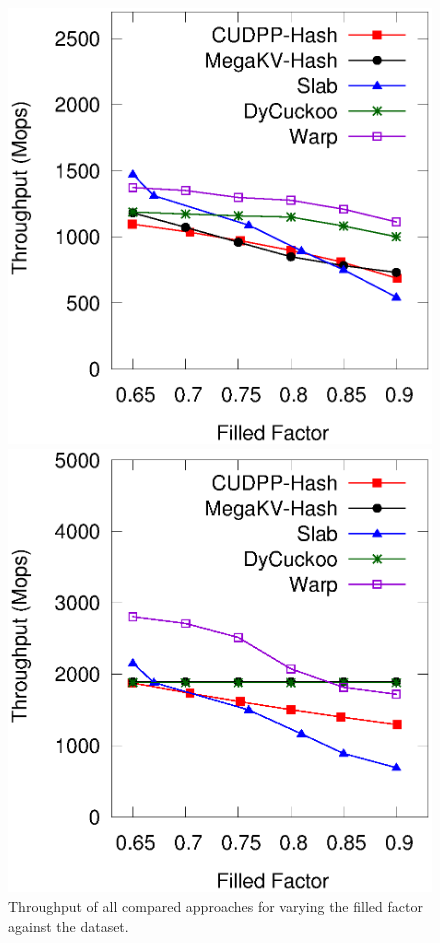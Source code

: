 \begin{figure}[h]
	\begin{minipage}{0.48\linewidth}\centering
		\includegraphics[width=\linewidth]{../pic/static-load_factor/reddit/insert.eps}
		\centerline{}
	\end{minipage}
	\hfill
	\begin{minipage}{0.48\linewidth}\centering
		\includegraphics[width=\linewidth]{../pic/static-load_factor/reddit/search.eps}
		\centerline{}
	\end{minipage}
	\caption{Throughput of all compared approaches for varying the filled factor against the \dsreddit dataset.}
	\label{fig:static-filled-factor}
\end{figure}

